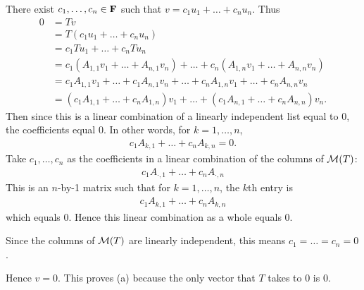 \documentclass[a5paper]{article}
\begin{document}
    There exist $c_1,\dots,c_n \in \mathbf{F}$ such that $v = c_1u_1 + \dots + c_nu_n$.
    Thus
\begin{align*}
        0 &= Tv \\
          &= T(c_1u_1 + \dots + c_nu_n) \\
          &= c_1Tu_1 + \dots + c_nTu_n \\
          &= c_1(A_{1,1}v_1 + \dots + A_{n,1}v_n) + \dots + c_n(A_{1,n}v_1 + \dots + A_{n,n}v_n) \\
          &= c_1A_{1,1}v_1 + \dots + c_1A_{n,1}v_n + \dots + c_nA_{1,n}v_1 + \dots + c_nA_{n,n}v_n \\
          &= (c_1A_{1,1} + \dots + c_nA_{1,n})v_1 + \dots + (c_1A_{n,1} + \dots + c_nA_{n,n})v_n .
\end{align*}
    Then since this is a linear combination of a linearly independent list equal to 0, the coefficients equal 0.
    In other words, for $k = 1,\dots,n$,
\begin{align*}
        c_1A_{k,1} + \dots + c_nA_{k,n} = 0 .
\end{align*}
    Take $c_1,\dots,c_n$ as the coefficients in a linear combination of the columns of $\mathcal{M}(T)$:
\begin{align*}
        c_1 A_{\cdot,1} + \dots + c_n A_{\cdot,n}
\end{align*}
    This is an $n$-by-1 matrix such that for $k = 1,\dots,n$, the $k$th entry is
\begin{align*}
        c_1A_{k,1} + \dots + c_nA_{k,n}
\end{align*}
    which equals 0.
    Hence this linear combination as a whole equals 0.

    Since the columns of $\mathcal{M}(T)$ are linearly independent, this means $c_1=\dots=c_n=0$.

    Hence $v=0$.
    This proves (a) because the only vector that $T$ takes to 0 is 0.
\end{document}
